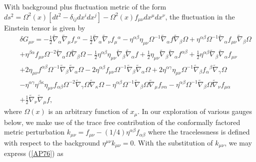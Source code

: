 With  background plus fluctuation metric of the form $ds^2=\Omega^2(x)[dt^2-\delta_{ij}dx^idx^j]-\Omega^2(x)f_{\mu\nu}dx^{\mu}dx^{\nu}$, the fluctuation in the Einstein tensor is given by 
%
\begin{eqnarray}
&&\delta G_{\mu\nu}=- \tfrac{1}{2}\tilde{\nabla}_{\alpha}\tilde{\nabla}_{\mu}f_{\nu}{}^{\alpha} -  \tfrac{1}{2} \tilde{\nabla}_{\alpha}\tilde{\nabla}_{\nu}f_{\mu}{}^{\alpha} -  \eta^{\alpha \beta} \eta_{\mu \nu} \Omega^{-1}\tilde{\nabla}_{\alpha}f \tilde{\nabla}_{\beta}\Omega + \eta^{\alpha \beta} \Omega^{-1} \tilde{\nabla}_{\alpha}f_{\mu \nu} \tilde{\nabla}_{\beta}\Omega
\nonumber\\
&& + \eta^{\beta \alpha} f_{\mu \nu} \Omega^{-2}\tilde{\nabla}_{\alpha}\Omega \tilde{\nabla}_{\beta}\Omega 
-  \tfrac{1}{2} \eta^{\alpha \beta} \eta_{\mu \nu} \tilde{\nabla}_{\beta}\tilde{\nabla}_{\alpha}f + \tfrac{1}{2} \eta_{\mu \nu}\tilde{\nabla}_{\beta}\tilde{\nabla}_{\alpha}f^{\alpha \beta} + \tfrac{1}{2} \eta^{\alpha \beta} \tilde{\nabla}_{\beta}\tilde{\nabla}_{\alpha}f_{\mu \nu}
\nonumber\\
&& + 2 \eta_{\mu \nu} f^{\alpha \beta} \Omega^{-1} \tilde{\nabla}_{\beta}\tilde{\nabla}_{\alpha}\Omega - 2 \eta^{\alpha \beta} f_{\mu \nu} \Omega^{-1} \tilde{\nabla}_{\beta}\tilde{\nabla}_{\alpha}\Omega 
+ 2 \eta^{\alpha \gamma} \eta_{\mu \nu} \Omega^{-1} \tilde{\nabla}_{\beta}f_{\alpha}{}^{\beta} \tilde{\nabla}_{\gamma}\Omega 
\nonumber\\
&&-  \eta^{\alpha \gamma} \eta^{\beta \kappa} \eta_{\mu \nu} f_{\alpha \beta} \Omega^{-2} \tilde{\nabla}_{\gamma}\Omega\tilde{\nabla}_{\kappa}\Omega -  \eta^{\alpha \beta} \Omega^{-1}\tilde{\nabla}_{\beta}\Omega \tilde{\nabla}_{\mu}f_{\nu \alpha} -  \eta^{\alpha \beta} \Omega^{-1}\tilde{\nabla}_{\beta}\Omega \tilde{\nabla}_{\nu}f_{\mu \alpha} 
\nonumber\\
&&+ \tfrac{1}{2} \tilde{\nabla}_{\nu}\tilde{\nabla}_{\mu}f,
\label{AP76}
\end{eqnarray}
%
where $\Omega(x)$ is an arbitrary function of $x_{\mu}$. In our exploration of various gauges below, we make use of the trace free contribution of the conformally factored metric perturbation $k_{\mu\nu}=f_{\mu\nu}-(1/4)\eta^{\alpha\beta}f_{\alpha\beta}$ where the tracelessness is defined with respect to the background $\eta^{\mu\nu}k_{\mu\nu}=0$. With the substitution of $k_{\mu\nu}$, we may express (\ref{AP76}) as 
%
